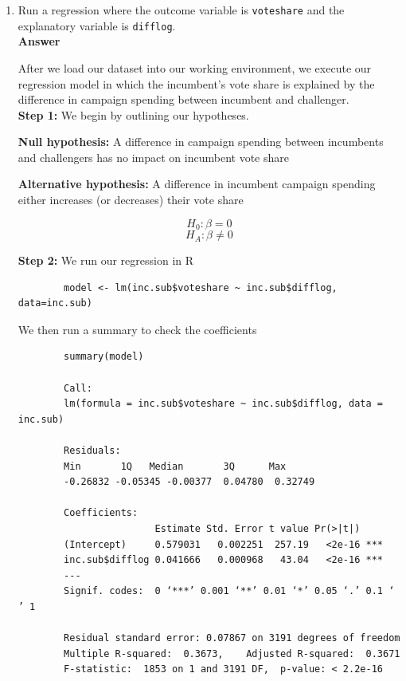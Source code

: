 \documentclass[12pt,letterpaper]{article}
\begin{document}
	\begin{enumerate}
		\item Run a regression where the outcome variable is \texttt{voteshare} and the explanatory variable is \texttt{difflog}. \\

	
\noindent 
\textbf{Answer}
		
		After we load our dataset into our working environment, we execute our regression
		model in which the incumbent's vote share is explained by the difference in campaign spending between incumbent and challenger. \\
		

		
		\textbf{Step 1:} We begin by outlining our hypotheses.
		
\textbf{Null hypothesis:}
		A difference in campaign spending between incumbents and challengers has no impact on incumbent vote share
		
\textbf{Alternative hypothesis: }
		A difference in incumbent campaign spending either increases (or decreases) their vote share 

	$$H_0: \beta = 0$$
	$$H_A: \beta \neq 0$$


		\textbf{Step 2:} We run our regression in R
		
		\begin{verbatim}
		model <- lm(inc.sub$voteshare ~ inc.sub$difflog, data=inc.sub)		
		\end{verbatim}
		
		We then run a summary to check the coefficients
		
		\begin{verbatim}
		summary(model)
		
		Call:
		lm(formula = inc.sub$voteshare ~ inc.sub$difflog, data = inc.sub)
		
		Residuals:
		Min       1Q   Median       3Q      Max 
		-0.26832 -0.05345 -0.00377  0.04780  0.32749 
		
		Coefficients:
						Estimate Std. Error t value Pr(>|t|)    
		(Intercept)     0.579031   0.002251  257.19   <2e-16 ***
		inc.sub$difflog 0.041666   0.000968   43.04   <2e-16 ***
		---
		Signif. codes:  0 ‘***’ 0.001 ‘**’ 0.01 ‘*’ 0.05 ‘.’ 0.1 ‘ ’ 1
		
		Residual standard error: 0.07867 on 3191 degrees of freedom
		Multiple R-squared:  0.3673,	Adjusted R-squared:  0.3671 
		F-statistic:  1853 on 1 and 3191 DF,  p-value: < 2.2e-16
		

\end{verbatim}
\end{enumerate}
\end{document}
